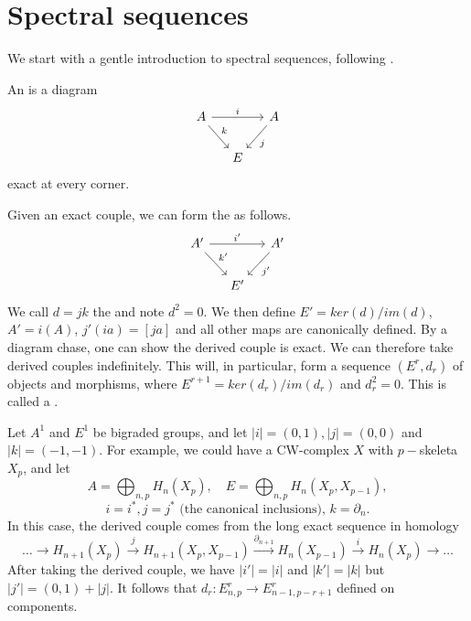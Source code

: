 \section{Spectral sequences}
We start with a gentle introduction to spectral sequences, following \cite{Hatcher-spec}.
\begin{definition}
An  is a diagram
\[\begin{tikzcd}[column sep=small, row sep=small]
A \arrow[rr, "i"] \arrow[rdd, "k"] &   & A \arrow[ldd, "j"] \\
                                   &   &                    \\
                                   & E &                   
\end{tikzcd}\]
exact at every corner.
\end{definition}
Given an exact couple, we can form the  as follows.
\[\begin{tikzcd}[column sep=small, row sep=small]
A' \arrow[rr, "i'"] \arrow[rdd, "k'"] &    & A' \arrow[ldd, "j'"] \\
                                      &    &                      \\
                                      & E' &                     
\end{tikzcd}\]
We call $d=jk$ the  and note $d^2=0$. We then define $E'=ker(d)/im(d)$, $A'=i(A)$, $j'(ia)=[ja]$ and all other maps are canonically defined. By a diagram chase, one can show the derived couple is exact. We can therefore take derived couples indefinitely. This will, in particular, form a sequence $(E^r,d_r)$ of objects and morphisms, where $E^{r+1}=ker(d_r)/im(d_r)$ and $d_r^2=0$. This is called a .

Let $A^1$ and $E^1$ be bigraded groups, and let $|i|=(0,1),|j|=(0,0)$ and $|k|=(-1,-1)$. For example, we could have a CW-complex $X$ with $p-$skeleta $X_p$, and let $$A=\bigoplus_{n,p}H_n(X_p), \quad E=\bigoplus_{n,p}H_n(X_p,X_{p-1}),$$ $$i=i^*, j=j^* \text{ (the canonical inclusions), } k=\partial_n.$$
In this case, the derived couple comes from the long exact sequence in homology
$$\dots\rightarrow H_{n+1}(X_p)\xrightarrow{j}H_{n+1}(X_p,X_{p-1})\xrightarrow{\partial_{n+1}}H_n(X_{p-1})\xrightarrow{i}H_n(X_p)\rightarrow \dots$$
After taking the derived couple, we have $|i'|=|i|$ and $|k'|=|k|$ but \newline $|j'|=(0,1)+|j|$. It follows that $d_r:E^r_{n,p}\rightarrow E^r_{n-1,p-r+1}$ defined on components. 

